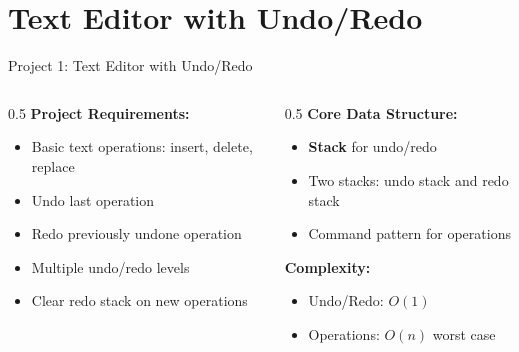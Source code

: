 \documentclass[aspectratio=169,xcolor=dvipsnames]{beamer}
\begin{document}
\section{Text Editor with Undo/Redo}

\begin{frame}{Project 1: Text Editor with Undo/Redo}
  \begin{columns}
    \begin{column}{0.5\textwidth}
      \textbf{Project Requirements:}
      \begin{itemize}
        \item Basic text operations: insert, delete, replace
        \item Undo last operation
        \item Redo previously undone operation
        \item Multiple undo/redo levels
        \item Clear redo stack on new operations
      \end{itemize}
    \end{column}

    \begin{column}{0.5\textwidth}
      \textbf{Core Data Structure:}
      \begin{itemize}
        \item \textbf{Stack} for undo/redo
        \item Two stacks: undo stack and redo stack
        \item Command pattern for operations
      \end{itemize}

      \vspace{0.3cm}
      \textbf{Complexity:}
      \begin{itemize}
        \item Undo/Redo: $O(1)$
        \item Operations: $O(n)$ worst case
      \end{itemize}
    \end{column}
  \end{columns}
\end{frame}
\end{document}
